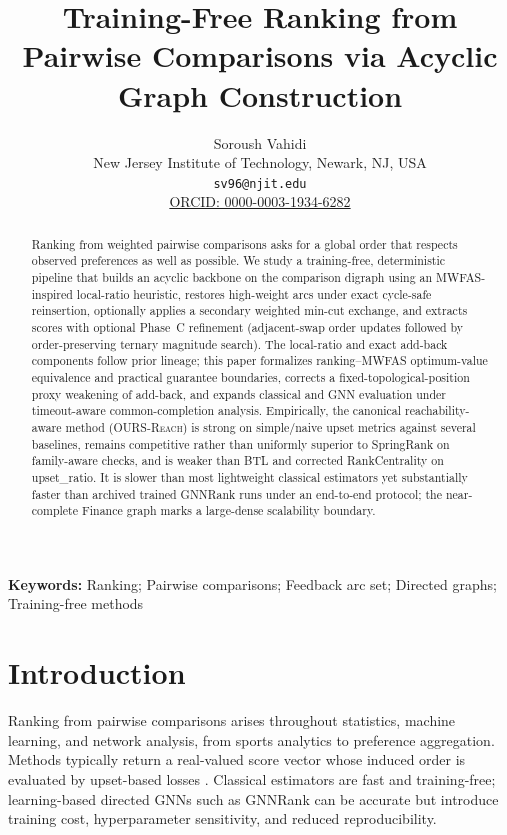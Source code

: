 \documentclass{article}
\title{Training-Free Ranking from Pairwise Comparisons via Acyclic Graph Construction}
\author{Soroush Vahidi\\
New Jersey Institute of Technology, Newark, NJ, USA\\
\texttt{sv96@njit.edu}\\
\href{https://orcid.org/0000-0003-1934-6282}{ORCID: 0000-0003-1934-6282}}
\date{}
\begin{document}
\maketitle

\begin{abstract}
Ranking from weighted pairwise comparisons asks for a global order that respects observed preferences as well as possible. We study a training-free, deterministic pipeline that builds an acyclic backbone on the comparison digraph using an MWFAS-inspired local-ratio heuristic, restores high-weight arcs under exact cycle-safe reinsertion, optionally applies a secondary weighted min-cut exchange, and extracts scores with optional Phase~C refinement (adjacent-swap order updates followed by order-preserving ternary magnitude search). The local-ratio and exact add-back components follow prior lineage; this paper formalizes ranking--MWFAS optimum-value equivalence and practical guarantee boundaries, corrects a fixed-topological-position proxy weakening of add-back, and expands classical and GNN evaluation under timeout-aware common-completion analysis. Empirically, the canonical reachability-aware method (\textsc{OURS-Reach}) is strong on simple/naive upset metrics against several baselines, remains competitive rather than uniformly superior to SpringRank on family-aware checks, and is weaker than BTL and corrected RankCentrality on upset\_ratio. It is slower than most lightweight classical estimators yet substantially faster than archived trained GNNRank runs under an end-to-end protocol; the near-complete Finance graph marks a large-dense scalability boundary.
\end{abstract}
\newcommand{\keywords}[1]{\textbf{Keywords:} #1}

\keywords{Ranking; Pairwise comparisons; Feedback arc set; Directed graphs; Training-free methods}
\section{Introduction}
\label{sec:intro}
Ranking from pairwise comparisons arises throughout statistics, machine learning, and network analysis, from sports analytics to preference aggregation. Methods typically return a real-valued score vector whose induced order is evaluated by upset-based losses \citet{he22}. Classical estimators are fast and training-free; learning-based directed GNNs such as GNNRank can be accurate but introduce training cost, hyperparameter sensitivity, and reduced reproducibility.
\end{document}
